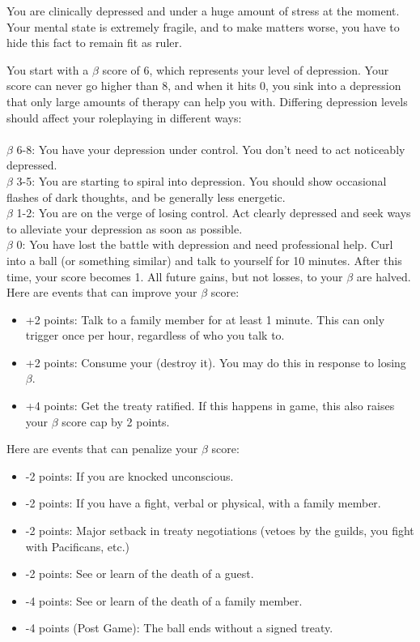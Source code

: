 \documentclass[green]{NeptuneBall}
\begin{document}
\name{\gDepression{}}

You are clinically depressed and under a huge amount of stress at the moment. Your mental state is extremely fragile, and to make matters worse, you have to hide this fact to remain fit as ruler.

You start with a $\beta$ score of 6, which represents your level of depression. Your score can never go higher than 8, and when it hits 0, you sink into a depression that only large amounts of therapy can help you with. Differing depression levels should affect your roleplaying in different ways: \\ \\
$\beta$ 6-8: You have your depression under control. You don't need to act noticeably depressed. \\
$\beta$ 3-5: You are starting to spiral into depression. You should show occasional flashes of dark thoughts, and be generally less energetic. \\
$\beta$ 1-2: You are on the verge of losing control. Act clearly depressed and seek ways to alleviate your depression as soon as possible. \\
$\beta$ 0: You have lost the battle with depression and need professional help. Curl into a ball (or something similar) and talk to yourself for 10 minutes. After this time, your score becomes 1. All future gains, but not losses, to your $\beta$ are halved. \\

Here are events that can improve your $\beta$ score: 

\begin{itemize}
\item +2 points: Talk to a family member for at least 1 minute. This can only trigger once per hour, regardless of who you talk to.
\item +2 points: Consume your \iTablets{} (destroy it). You may do this in response to losing $\beta$.
\item +4 points: Get the treaty ratified. If this happens in game, this also raises your $\beta$ score cap by 2 points.
\end{itemize}

Here are events that can penalize your $\beta$ score:

\begin{itemize}
\item -2 points: If you are knocked unconscious.
\item -2 points: If you have a fight, verbal or physical, with a family member.
\item -2 points: Major setback in treaty negotiations (vetoes by the guilds, you fight with Pacificans, etc.)
\item -2 points: See or learn of the death of a guest.
\item -4 points: See or learn of the death of a family member.
\item -4 points (Post Game): The ball ends without a signed treaty.
\end{itemize}
\end{document}
